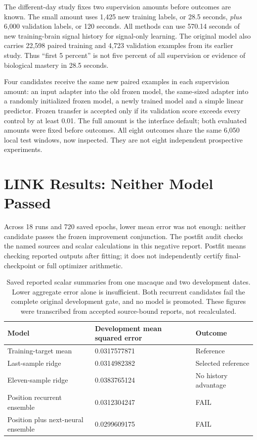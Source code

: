 The different-day study fixes two supervision amounts before outcomes are
known. The small amount uses 1,425 new training labels, or 28.5 seconds, \emph{plus}
6,000 validation labels, or 120 seconds. All methods can use 570.14 seconds of
new training-brain signal history for signal-only learning. The original model
also carries 22,598 paired training and 4,723 validation examples from its
earlier study. Thus ``first 5 percent'' is not five percent of all supervision
or evidence of biological mastery in 28.5 seconds.

Four candidates receive the same new paired examples in each supervision
amount: an input adapter into the old frozen model, the same-sized adapter into
a randomly initialized frozen model, a newly trained model and a simple linear
predictor. Frozen transfer is accepted only if its validation score exceeds
every control by at least 0.01. The full amount is the interface default;
both evaluated amounts were fixed before outcomes. All eight outcomes share
the same 6,050 local test windows, now inspected. They are not eight independent
prospective experiments.

\section{LINK Results: Neither Model Passed}

Across 18 runs and 720 saved epochs, lower mean error was not enough: neither candidate passes the frozen improvement conjunction. The postfit audit checks the named sources and scalar calculations in this negative report. Postfit means checking reported outputs after fitting; it does not independently certify final-checkpoint or full optimizer arithmetic.

\begin{table}[t]
\centering\small
\begin{tabular}{p{.40\linewidth}p{.28\linewidth}p{.24\linewidth}}
\toprule Model & Development mean squared error & Outcome\\\midrule
Training-target mean &0.0317577871&Reference\\
Last-sample ridge &0.0314982382&Selected reference\\
Eleven-sample ridge &0.0383765124&No history advantage\\
Position recurrent ensemble &0.0312304247&FAIL\\
Position plus next-neural ensemble &0.0299609175&FAIL\\\bottomrule
\end{tabular}
\caption{Saved reported scalar summaries from one macaque and two development
dates. Lower aggregate error alone is insufficient. Both recurrent candidates
fail the complete original development gate, and no model is promoted. These
figures were transcribed from accepted source-bound reports, not recalculated.}
\end{table}


